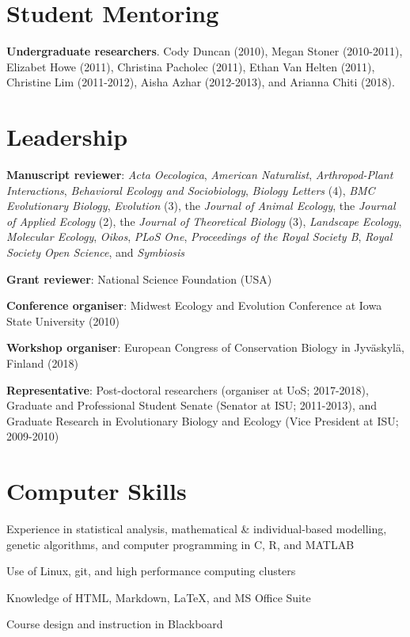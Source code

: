 \documentclass[letterpaper]{article}
\renewenvironment{itemize}{
  \begin{list}{}{
    \setlength{\leftmargin}{1.5em}
  }
}{
  \end{list}
}
\begin{document}
\section*{Student Mentoring}
\begin{itemize}
\item {\bf Undergraduate researchers}. Cody Duncan (2010), Megan Stoner (2010-2011), Elizabet Howe (2011), Christina Pacholec (2011), Ethan Van Helten (2011), Christine Lim (2011-2012), Aisha Azhar (2012-2013), and Arianna Chiti (2018).
\end{itemize}

\section*{Leadership}
\begin{itemize}
\item {\bf Manuscript reviewer}: {\it Acta Oecologica}, {\it American Naturalist}, {\it Arthropod-Plant Interactions}, {\it Behavioral Ecology and Sociobiology}, {\it Biology Letters} (4), {\it BMC Evolutionary Biology}, {\it Evolution} (3), the {\it Journal of Animal Ecology}, the {\it Journal of Applied Ecology} (2), the {\it Journal of Theoretical Biology} (3), {\it Landscape Ecology}, {\it Molecular Ecology}, {\it Oikos}, {\it PLoS One}, {\it Proceedings of the Royal Society B}, {\it Royal Society Open Science}, and {\it Symbiosis}
\item {\bf Grant reviewer}: National Science Foundation (USA) 
\item {\bf Conference organiser}: Midwest Ecology and Evolution Conference at Iowa State University (2010)
\item {\bf Workshop organiser}: European Congress of Conservation Biology in Jyv\"{a}skyl\"{a}, Finland (2018)
\item {\bf Representative}: Post-doctoral researchers (organiser at UoS; 2017-2018), Graduate and Professional Student Senate (Senator at ISU; 2011-2013), and Graduate Research in Evolutionary Biology and Ecology (Vice President at ISU; 2009-2010)
\end{itemize}

\section*{Computer Skills}
\begin{itemize}
\item Experience in statistical analysis, mathematical \& individual-based modelling, genetic algorithms, and computer programming in C, R, and MATLAB
\item Use of Linux, git, and high performance computing clusters
\item Knowledge of HTML, Markdown, \LaTeX, and MS Office Suite
\item Course design and instruction in Blackboard
\end{itemize}
\end{document}
